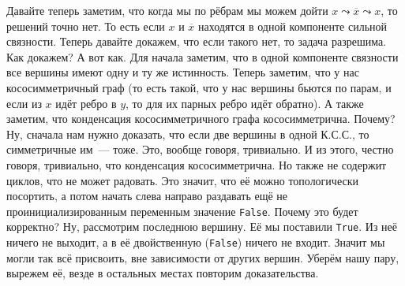 \documentclass{article}
\begin{document}
    Давайте теперь заметим, что когда мы по рёбрам мы можем дойти $x\leadsto\overline x\leadsto x$, то решений точно нет. То есть если $x$ и $\overline x$ находятся в одной компоненте сильной связности. Теперь давайте докажем, что если такого нет, то задача разрешима. Как докажем? А вот как. Для начала заметим, что в одной компоненте связности все вершины имеют одну и ту же истинность. Теперь заметим, что у нас кососимметричный граф (то есть такой, что у нас вершины бьются по парам, и если из $x$ идёт ребро в $y$, то для их парных ребро идёт обратно). А также заметим, что конденсация кососимметричного графа кососимметрична. Почему? Ну, сначала нам нужно доказать, что если две вершины в одной К.С.С., то симметричные им~--- тоже. Это, вообще говоря, тривиально. И из этого, честно говоря, тривиально, что конденсация кососимметрична. Но также не содержит циклов, что не может радовать. Это значит, что её можно топологически посортить, а потом начать слева направо раздавать ещё не проинициализированным переменным значение \texttt{False}. Почему это будет корректно? Ну, рассмотрим последнюю вершину. Её мы поставили \texttt{True}. Из неё ничего не выходит, а в её двойственную (\texttt{False}) ничего не входит. Значит мы могли так всё присвоить, вне зависимости от других вершин. Уберём нашу пару, вырежем её, везде в остальных местах повторим доказательства.
\end{document}
